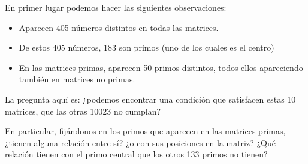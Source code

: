En primer lugar podemos hacer las siguientes observaciones:
\begin{itemize}
    \item Aparecen 405 números distintos en todas las matrices.
    \item De estos 405 números, 183 son primos (uno de los cuales es el centro)
    \item En las matrices primas, aparecen 50 primos distintos, todos ellos apareciendo también en matrices no primas.
\end{itemize}

La pregunta aquí es: ¿podemos encontrar una condición que satisfacen estas 10 matrices, que las otras 10023 no cumplan?

En particular, fijándonos en los primos que aparecen en las matrices primas, ¿tienen alguna relación entre sí? ¿o con sus posiciones en la matriz? ¿Qué relación tienen con el primo central que los otros 133 primos no tienen?

\newpage
{}

